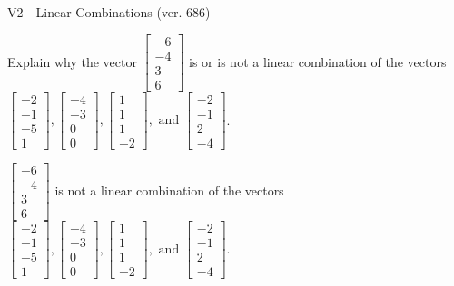 \begin{exercise}
  \begin{exerciseTitle}V2 - Linear Combinations (ver. 686)\end{exerciseTitle}
  \begin{exerciseStatement}
    Explain why the vector \(\left[\begin{array}{c}
-6 \\
-4 \\
3 \\
6
\end{array}\right]\)  is or is not a linear 
	combination of the vectors \(\left[\begin{array}{c}
-2 \\
-1 \\
-5 \\
1
\end{array}\right] , \left[\begin{array}{c}
-4 \\
-3 \\
0 \\
0
\end{array}\right] , \left[\begin{array}{c}
1 \\
1 \\
1 \\
-2
\end{array}\right] , \text{ and } \left[\begin{array}{c}
-2 \\
-1 \\
2 \\
-4
\end{array}\right]\).
	


  \end{exerciseStatement}
  \begin{exerciseAnswer}
   \(\left[\begin{array}{c}
-6 \\
-4 \\
3 \\
6
\end{array}\right]\) 
  	 is not  
	a linear combination of the vectors \(\left[\begin{array}{c}
-2 \\
-1 \\
-5 \\
1
\end{array}\right] , \left[\begin{array}{c}
-4 \\
-3 \\
0 \\
0
\end{array}\right] , \left[\begin{array}{c}
1 \\
1 \\
1 \\
-2
\end{array}\right] , \text{ and } \left[\begin{array}{c}
-2 \\
-1 \\
2 \\
-4
\end{array}\right]\).


\end{exerciseAnswer}
\end{exercise}
